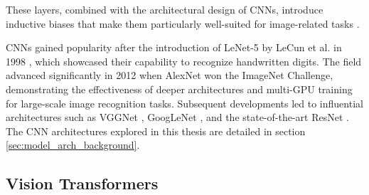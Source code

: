 \noindent These layers, combined with the architectural design of CNNs, introduce inductive biases that make them particularly well-suited for image-related tasks \cite{kim2020inductivebias}. 



CNNs gained popularity after the introduction of LeNet-5 by LeCun et al. in 1998 \cite{lecun1998}, which showcased their capability to recognize handwritten digits. The field advanced significantly in 2012 when AlexNet \cite{NIPS2012_c399862d} won the ImageNet Challenge, demonstrating the effectiveness of deeper architectures and multi-GPU training for large-scale image recognition tasks. Subsequent developments led to influential architectures such as VGGNet \cite{simonyan2015deepconvolutionalnetworkslargescale}, GoogLeNet \cite{szegedy2014goingdeeperconvolutions}, and the state-of-the-art ResNet \cite{he2015deepresiduallearningimage}. The CNN architectures explored in this thesis are detailed in section \ref{sec:model_arch_background}.


\subsection{Vision Transformers}
\label{sec:ViTs}

